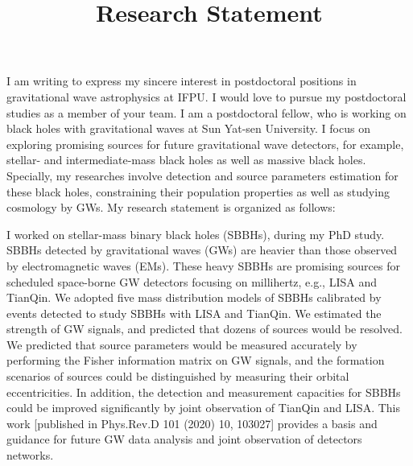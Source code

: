 \documentclass[12pt,a4paper,sans]{article}%
\title{\vspace{-2.5cm}\Huge Research Statement \vspace{-2.2em}}
\date{}
\begin{document}
\maketitle

I am writing to express my sincere interest in postdoctoral positions in gravitational wave astrophysics at IFPU. I would love to
pursue my postdoctoral studies as a member of your team. I am a postdoctoral fellow, who is working on black holes with gravitational waves at Sun Yat-sen University.
I focus on exploring promising sources for future gravitational wave detectors, for example, stellar- and
intermediate-mass black holes as well as massive black holes. Specially, my researches involve detection
and source parameters estimation for these black holes, constraining their population properties as well as studying
cosmology by GWs. My research statement is organized as
follows:  

I worked on stellar-mass binary black holes (SBBHs), during my PhD study. SBBHs detected by
gravitational waves (GWs) are heavier than those observed by electromagnetic waves (EMs). These heavy SBBHs are promising sources for scheduled
space-borne GW detectors focusing on millihertz, e.g., LISA and TianQin. We adopted five mass
distribution models of SBBHs calibrated by events detected to study SBBHs with LISA and TianQin. We estimated the
strength of GW signals, and predicted that dozens of sources would be resolved. We predicted that source parameters
would be measured accurately by performing the Fisher information matrix on GW signals, and the formation scenarios of sources
could be distinguished by measuring their orbital eccentricities. In addition, the detection and measurement capacities
for SBBHs could be improved significantly by joint
observation of TianQin and LISA. This work [published in Phys.Rev.D 101 (2020) 10, 103027] provides a basis and guidance for future GW
data analysis and joint observation of detectors networks. 
\end{document}
